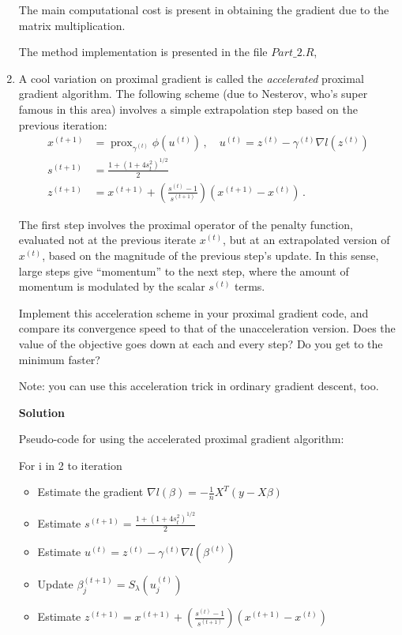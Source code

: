 \documentclass[11 pt]{article}
\newcommand{\prox}{ \mathop{\mathrm{prox}} }
\begin{document}
\begin{enumerate}[label=(\Alph*)]
	The main computational cost is present in obtaining the gradient due to the matrix multiplication.
		
	
	The method implementation is presented in the file $Part\_2.R$,
	
	
	
	\newpage
	\item A cool variation on proximal gradient is called the \textit{accelerated} proximal gradient algorithm.   The following scheme (due to Nesterov, who's super famous in this area) involves a simple extrapolation step based on the previous iteration:
	$$
	\begin{aligned}
	x^{(t+1)} &= \prox_{ \gamma^{(t)}} \phi(u^{(t)}) \, , \quad u^{(t)} =  z^{(t)} - \gamma^{(t)} \nabla l(z^{(t)})  \\
	s^{(t+1)} &= \frac{1 + (1 + 4 s_{t}^2)^{1/2}}{2} \\
	z^{(t+1)} &=  x^{(t+1)} + \left( \frac{s^{(t)} - 1}{s^{(t+1)}} \right) (x^{(t+1)} - x^{(t)}) \, .
	\end{aligned}
	$$
	
	
	
	The first step involves the proximal operator of the penalty function, evaluated not at the previous iterate $x^{(t)}$, but at an extrapolated version of $x^{(t)}$, based on the magnitude of the previous step's update.  In this sense, large steps give ``momentum'' to the next step, where the amount of momentum is modulated by the scalar $s^{(t)}$ terms.
	
	Implement this acceleration scheme in your proximal gradient code, and compare its convergence speed to that of the unacceleration version.  Does the value of the objective goes down at each and every step?  Do you get to the minimum faster?
	
	Note: you can use this acceleration trick in ordinary gradient descent, too.
	
	\vspace{2mm}
	\textbf{Solution}
	
	Pseudo-code for using the accelerated proximal gradient algorithm: \\
	\vspace{2mm}
	
	For i in 2 to iteration
	\begin{itemize}
		\item Estimate the gradient $ \nabla l(\beta) = -\frac{1}{n}X^T(y-X\beta) $
		\item Estimate $s^{(t+1)} = \frac{1 + (1 + 4 s_{t}^2)^{1/2}}{2}$
		\item Estimate $ u^{(t)} = z^{(t)} - \gamma^{(t)} \nabla l(\beta^{(t)}) $
		\item Update $ \beta^{(t+1)}_j = S_\lambda(u^{(t)}_j)$
		\item Estimate $z^{(t+1)} =  x^{(t+1)} + \left( \frac{s^{(t)} - 1}{s^{(t+1)}} \right) (x^{(t+1)} - x^{(t)})$
	\end{itemize}
	

\end{enumerate}
\end{document}
